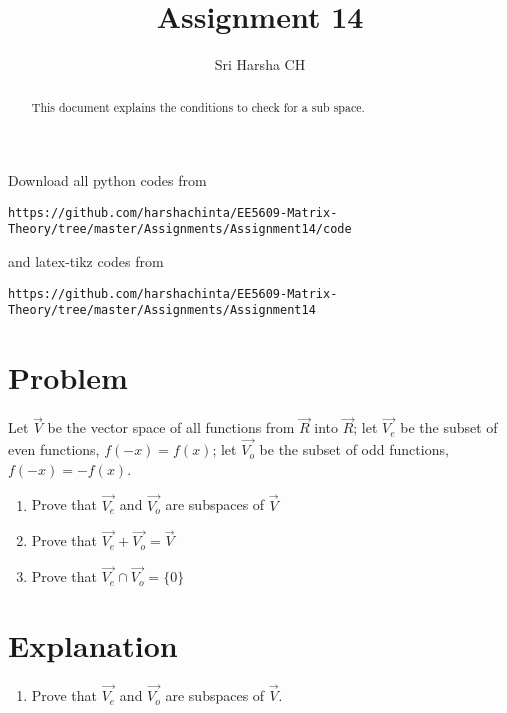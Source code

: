 \documentclass[journal,12pt,twocolumn]{IEEEtran}
\begin{document}
\renewcommand{\thefigure}{\theproblem}

\def\putbox#1#2#3{\makebox[0in][l]{\makebox[#1][l]{}\raisebox{\baselineskip}[0in][0in]{\raisebox{#2}[0in][0in]{#3}}}}
     \def\rightbox#1{\makebox[0in][r]{#1}}
     \def\centbox#1{\makebox[0in]{#1}}
     \def\topbox#1{\raisebox{-\baselineskip}[0in][0in]{#1}}
     \def\midbox#1{\raisebox{-0.5\baselineskip}[0in][0in]{#1}}
\vspace{3cm}
\title{Assignment 14}
\author{Sri Harsha CH}

\maketitle
\newpage

\bigskip
\renewcommand{\thefigure}{\theenumi}
\renewcommand{\thetable}{\theenumi}

\begin{abstract}
This document explains the conditions to check for a sub space. 
\end{abstract}

Download all python codes from 
\begin{lstlisting}
https://github.com/harshachinta/EE5609-Matrix-Theory/tree/master/Assignments/Assignment14/code
\end{lstlisting}
%
and latex-tikz codes from 
%
\begin{lstlisting}
https://github.com/harshachinta/EE5609-Matrix-Theory/tree/master/Assignments/Assignment14
\end{lstlisting}
%
\section{Problem}
Let $\vec{V}$ be the  vector space of all functions from $\vec{R}$ into $\vec{R}$; let $\vec{V_e}$ be the subset of even functions, $f(-x) = f(x)$; let $\vec{V_o}$ be the subset of odd functions, $f(-x) = -f(x)$.
\begin{enumerate}
   \item Prove that $\vec{V_e}$ and $\vec{V_o}$ are subspaces of $\vec{V}$
   \item Prove that $\vec{V_e} + \vec{V_o} = \vec{V}$
    \item Prove that $\vec{V_e} \cap \vec{V_o} = \{0\}$
 \end{enumerate}
\section{Explanation}
 \begin{enumerate}
   \item Prove that $\vec{V_e}$ and $\vec{V_o}$ are subspaces of $\vec{V}$.
 \end{enumerate}
\end{document}
